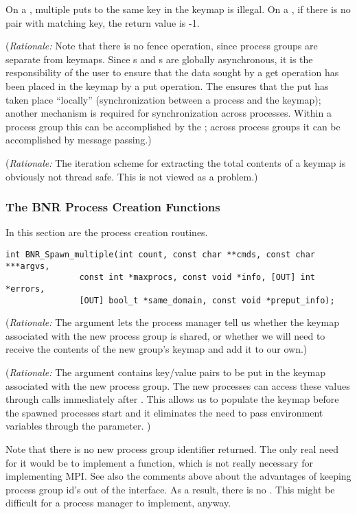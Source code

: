 \documentclass{article}
\begin{document}
On a , multiple puts to the same key in the keymap is illegal.
On a , if there is no pair with matching key, the return value is -1.

({\em Rationale:\/}  Note that there is no fence operation, since process
groups are separate from keymaps.  Since s and s
are globally asynchronous, it is the responsibility of the user to ensure that
the data sought by a get operation has been placed in the keymap by a put
operation.  The  ensures that the put has taken place
``locally'' (synchronization between a process and the keymap); 
another mechanism is required for synchronization across processes.  Within
a process group this can be accomplished by the ; across
process groups it can be accomplished by message passing.)

({\em Rationale:\/}  The iteration scheme for extracting the total contents
of a keymap is obviously not thread safe.  This is not viewed as a problem.)

\subsubsection{The BNR Process Creation Functions}
\label{sec:bnr-spawn}

In this section are the process creation routines.

\begin{verbatim}
int BNR_Spawn_multiple(int count, const char **cmds, const char ***argvs, 
		       const int *maxprocs, const void *info, [OUT] int *errors, 
		       [OUT] bool_t *same_domain, const void *preput_info);
\end{verbatim}

({\em Rationale:\/}  The  argument lets the process manager
tell us whether the keymap associated with the new process group is shared,
or whether we will need to receive the contents of the new group's keymap
and add it to our own.)

({\em Rationale:\/}  The  argument contains key/value pairs
to be put in the keymap associated with the new process group.  The new processes
can access these values through  calls immediately after
.  This allows us to populate the keymap before the spawned 
processes start and it eliminates the need to pass environment variables through
the  parameter.
)

Note that there is no new process group identifier returned.  The only real
need for it would be to implement a  function, which is not
really necessary for implementing MPI.  See also the comments above about the
advantages of keeping process group id's out of the interface.  As a result,
there is no .  This might be difficult for a process manager to
implement, anyway. 
\end{document}
